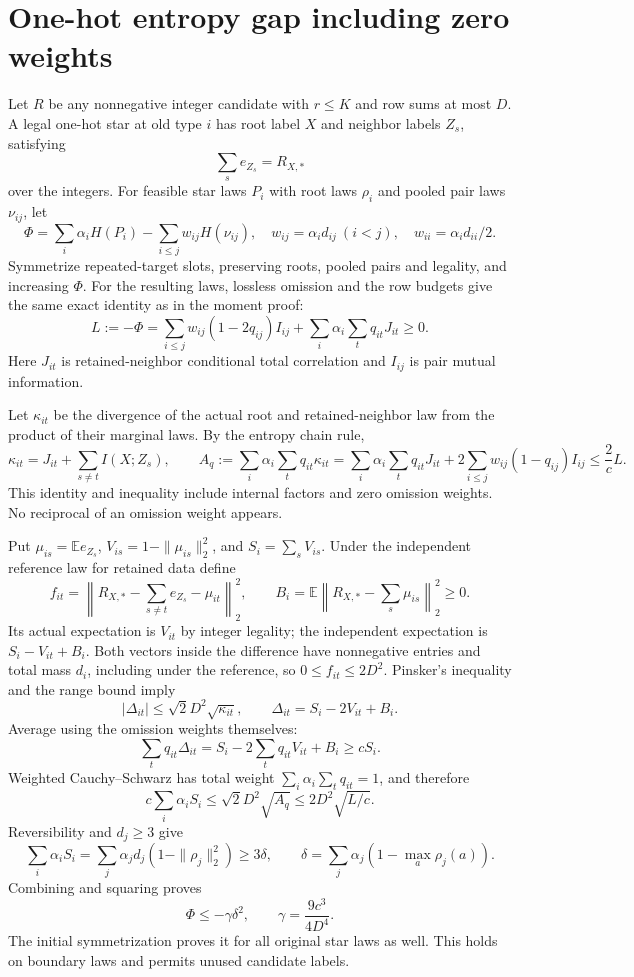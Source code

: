 \documentclass[11pt]{article}
\newcommand{\E}{\mathbb E}
\begin{document}
\section{One-hot entropy gap including zero weights}
Let $R$ be any nonnegative integer candidate with $r\le K$ and row sums at most $D$. A legal one-hot star at old type $i$ has root label $X$ and neighbor labels $Z_s$, satisfying
\[
 \sum_se_{Z_s}=R_{X,*}
\]
over the integers. For feasible star laws $P_i$ with root laws $\rho_i$ and pooled pair laws $\nu_{ij}$, let
\[
 \Phi=\sum_i\alpha_iH(P_i)-\sum_{i\le j}w_{ij}H(\nu_{ij}),\quad
 w_{ij}=\alpha_id_{ij}\ (i<j),\quad w_{ii}=\alpha_id_{ii}/2.
\]
Symmetrize repeated-target slots, preserving roots, pooled pairs and legality, and increasing $\Phi$. For the resulting laws, lossless omission and the row budgets give the same exact identity as in the moment proof:
\begin{equation}\label{eq:entropy}
 L:=-\Phi=\sum_{i\le j}w_{ij}(1-2q_{ij})I_{ij}
 +\sum_i\alpha_i\sum_tq_{it}J_{it}\ge0.
\end{equation}
Here $J_{it}$ is retained-neighbor conditional total correlation and $I_{ij}$ is pair mutual information.

Let $\kappa_{it}$ be the divergence of the actual root and retained-neighbor law from the product of their marginal laws. By the entropy chain rule,
\[
 \kappa_{it}=J_{it}+\sum_{s\ne t}I(X;Z_s),\qquad
 A_q:=\sum_i\alpha_i\sum_tq_{it}\kappa_{it}
 =\sum_i\alpha_i\sum_tq_{it}J_{it}
 +2\sum_{i\le j}w_{ij}(1-q_{ij})I_{ij}\le\frac2cL.
\]
This identity and inequality include internal factors and zero omission weights. No reciprocal of an omission weight appears.

Put $\mu_{is}=\E e_{Z_s}$, $V_{is}=1-\|\mu_{is}\|_2^2$, and $S_i=\sum_sV_{is}$. Under the independent reference law for retained data define
\[
 f_{it}=\left\|R_{X,*}-\sum_{s\ne t}e_{Z_s}-\mu_{it}\right\|_2^2,
 \qquad B_i=\E\left\|R_{X,*}-\sum_s\mu_{is}\right\|_2^2\ge0.
\]
Its actual expectation is $V_{it}$ by integer legality; the independent expectation is $S_i-V_{it}+B_i$. Both vectors inside the difference have nonnegative entries and total mass $d_i$, including under the reference, so $0\le f_{it}\le2D^2$. Pinsker's inequality and the range bound imply
\[
 |\Delta_{it}|\le\sqrt2D^2\sqrt{\kappa_{it}},\qquad
 \Delta_{it}=S_i-2V_{it}+B_i.
\]
Average using the omission weights themselves:
\[
 \sum_tq_{it}\Delta_{it}=S_i-2\sum_tq_{it}V_{it}+B_i\ge cS_i.
\]
Weighted Cauchy--Schwarz has total weight $\sum_i\alpha_i\sum_tq_{it}=1$, and therefore
\[
 c\sum_i\alpha_iS_i\le\sqrt2D^2\sqrt{A_q}\le2D^2\sqrt{L/c}.
\]
Reversibility and $d_j\ge3$ give
\[
 \sum_i\alpha_iS_i
 =\sum_j\alpha_jd_j(1-\|\rho_j\|_2^2)
 \ge3\delta,\qquad
 \delta=\sum_j\alpha_j(1-\max_a\rho_j(a)).
\]
Combining and squaring proves
\begin{equation}\label{eq:gap}
 \Phi\le-\gamma\delta^2,\qquad\gamma=\frac{9c^3}{4D^4}.
\end{equation}
The initial symmetrization proves it for all original star laws as well. This holds on boundary laws and permits unused candidate labels.
\end{document}
